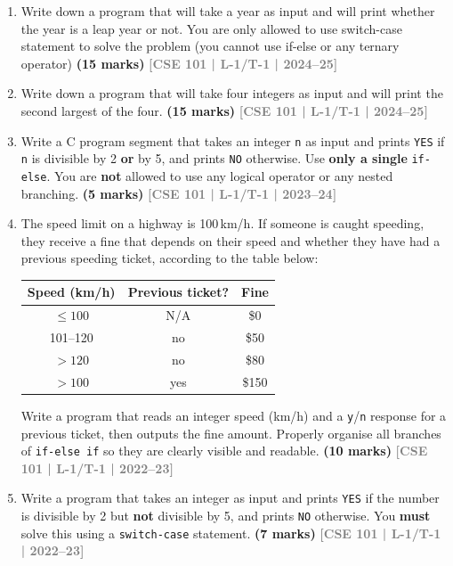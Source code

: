 \documentclass[12pt,a3paper]{article}
\newcommand{\yr}[1]{\hfill\textcolor{gray}{\small\textbf{[#1]}}}
\newcommand{\mk}[1]{\textcolor{orange!70!black}{\small\textbf{(#1 marks)}}}
\begin{document}
\begin{enumerate}

  \item Write down a program that will take a year as input and will print whether the year is a leap year or not. You are only allowed to use switch-case statement to solve the problem (you cannot use if-else or any ternary operator)
  \mk{15} \yr{CSE 101 | L-1/T-1 | 2024--25}

\item Write down a program that will take four integers as input and will print the second largest of the four.
  \mk{15} \yr{CSE 101 | L-1/T-1 | 2024--25}


\item Write a C program segment that takes an integer \texttt{n} as input and prints \texttt{YES} if \texttt{n} is divisible by 2 \textbf{or} by 5, and prints \texttt{NO} otherwise. Use \textbf{only a single} \texttt{if-else}. You are \textbf{not} allowed to use any logical operator or any nested branching.
\mk{5} \yr{CSE 101 | L-1/T-1 | 2023--24}

\item The speed limit on a highway is 100\,km/h. If someone is caught speeding, they receive a fine that depends on their speed and whether they have had a previous speeding ticket, according to the table below:
\begin{center}
  \begin{tabular}{|c|c|c|}
    \hline
    \textbf{Speed (km/h)} & \textbf{Previous ticket?} & \textbf{Fine} \\ \hline
    $\le 100$   & N/A & \$0   \\ \hline
    101--120    & no  & \$50  \\ \hline
    $> 120$     & no  & \$80  \\ \hline
    $> 100$     & yes & \$150 \\ \hline
  \end{tabular}
\end{center}
Write a program that reads an integer speed (km/h) and a \texttt{y}/\texttt{n} response for a previous ticket, then outputs the fine amount. Properly organise all branches of \texttt{if-else if} so they are clearly visible and readable.
\mk{10} \yr{CSE 101 | L-1/T-1 | 2022--23}

\item Write a program that takes an integer as input and prints \texttt{YES} if the number is divisible by 2 but \textbf{not} divisible by 5, and prints \texttt{NO} otherwise. You \textbf{must} solve this using a \texttt{switch-case} statement.
\mk{7} \yr{CSE 101 | L-1/T-1 | 2022--23}


\end{enumerate}
\end{document}
